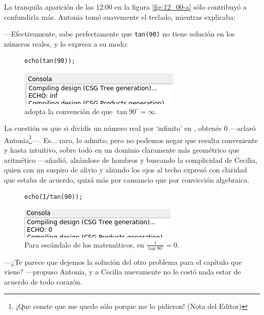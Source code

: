 La tranquila aparición de las 12:00 en la figura \ref{fig:12_00-a}
sólo contribuyó a confundirla más. Antonia tomó suavemente el teclado,
mientras explicaba:

---Efectivamente, \openscad{} sabe perfectamente que
\lstinline!tan(90)! no tiene solución en los números reales, y lo
expresa a su modo:


\begin{figure}[ht]
  \begin{minipage}[]{.4\textwidth}
\begin{lstlisting}[numbers=none]
echo(tan(90));
\end{lstlisting}%
  \end{minipage}\hfill
  \begin{minipage}[]{.6\textwidth}
    \centering
  \includegraphics[width=.9\textwidth]{imagenes/tangente-90}  
  \end{minipage}
  \caption{\openscad{} adopta la convención de que
    $\tan 90^{\circ}=\infty$.}
  \label{fig:tangente-90}
\end{figure}


\guillemotright La cuestión es que si dividís un número real por
`infinito' en \openscad{}, obtenés 0 ---aclaró Antonia\footnote{¡Que
  conste que me quedo sólo porque me lo pidieron! (Nota del
  Editor)}---.  Es... raro, lo admito; pero no podemos negar que
resulta conveniente y hasta intuitivo, sobre todo en un dominio
claramente más geométrico que aritmético ---añadió, alzándose de
hombros y buscando la complicidad de Cecilia, quien con un suspiro de
alivio y alzando los ojos al techo expresó con claridad que estaba de
acuerdo, quizá más por cansancio que por convicción algebraica.




\begin{figure}[ht]
  \begin{minipage}[]{.4\textwidth}
\begin{lstlisting}[numbers=none]
echo(1/tan(90));
\end{lstlisting}%
  \end{minipage}\hfill
  \begin{minipage}[]{.6\textwidth}
    \centering
  \includegraphics[width=.9\textwidth]{imagenes/tangente-90-a}  
  \end{minipage}
  \caption{Para escándalo de los matemáticos, en \openscad{}
    $\frac{1}{\tan 90^{\circ}}=0$.}%
  \label{fig:tangente-90-a}
\end{figure}

---¿Te parece que dejemos la solución del otro problema para el
capítulo que viene? ---propuso Antonia, y a Cecilia nuevamente no le
costó nada estar de acuerdo de todo corazón.







